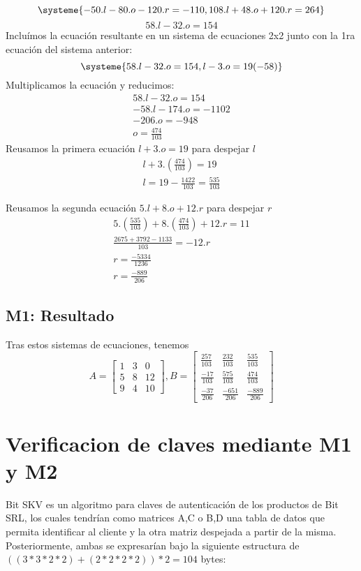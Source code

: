 \documentclass[11pt]{article}
\begin{document}
\begin{equation*}
\systeme{-50.l - 80.o - 120.r = -110,
108.l + 48.o + 120.r = 264
}
\end{equation*}
\begin{equation*}
58.l - 32.o = 154
\end{equation*}
Incluímos la ecuación resultante en un sistema de ecuaciones 2x2 junto con la 1ra ecuación del sistema anterior:
\begin{equation*}
\systeme{
58.l - 32.o = 154,
l - 3.o = 19 (-58)
}
\end{equation*}
Multiplicamos la ecuación y reducimos:
\begin{align*}
58.l - 32.o = 154\\
-58.l - 174.o = -1102\\
-206.o = -948\\
o = \frac{474}{103}
\end{align*}
Reusamos la primera ecuación $l + 3.o = 19$ para despejar $l$
\begin{align*}
l + 3.(\frac{474}{103}) = 19 \\
l = 19 - \frac{1422}{103} = \frac{535}{103}
\end{align*}

Reusamos la segunda ecuación $5.l + 8.o + 12.r$ para despejar $r$
\begin{align*}
5.(\frac{535}{103}) + 8.(\frac{474}{103}) + 12.r = 11\\
\frac{2675+3792-1133}{103} = -12 . r\\
r = \frac{-5334}{1236}\\
r = \frac{-889}{206}
\end{align*}
\pagebreak
\subsection{M1: Resultado}
Tras estos sistemas de ecuaciones, tenemos
\[
A = \begin{bmatrix}
1 & 3 & 0\\
5 & 8 & 12\\
9 & 4 & 10
\end{bmatrix}, B = \begin{bmatrix}
\frac{257}{103} & \frac{232}{103} & \frac{535}{103} \\
\frac{-17}{103} & \frac{575}{103} & \frac{474}{103} \\
\frac{-37}{206} & \frac{-651}{206} & \frac{-889}{206}
\end{bmatrix}
\]
\pagebreak
\section{Verificacion de claves mediante M1 y M2}
Bit SKV es un algoritmo para claves de autenticación de los productos de Bit SRL, los cuales tendrían como matrices A,C o B,D una tabla de datos que permita identificar al cliente y la otra matriz despejada a partir de la misma. Posteriormente, ambas se expresarían bajo la siguiente estructura de $((3*3*2*2)+(2*2*2*2))*2 = 104$ bytes:
\end{document}
